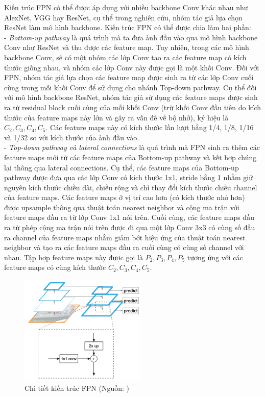 {    \noindent
    Kiến trúc FPN có thể được áp dụng với nhiều backbone Conv khác nhau như AlexNet, VGG hay ResNet, cụ thể trong nghiên cứu, nhóm tác giả lựa chọn ResNet làm mô hình backbone.
    Kiến trúc FPN có thể được chia làm hai phần: \\
    - \textit{Bottom-up pathway} là quá trình mà ta đưa ảnh đầu vào qua mô hình backbone Conv như ResNet và thu được các feature map.
    Tuy nhiên, trong các mô hình backbone Conv, sẽ có một nhóm các lớp Conv tạo ra các feature map có kích thước giống nhau, và nhóm các lớp Conv này được gọi là một khối Conv.
    Đối với FPN, nhóm tác giả lựa chọn các feature map được sinh ra từ các lớp Conv cuối cùng trong mỗi khối Conv để sử dụng cho nhánh Top-down pathway.
    Cụ thể đối với mô hình backbone ResNet, nhóm tác giả sử dụng các feature maps được sinh ra từ residual block cuối cùng của mỗi khối Conv (trừ khối Conv đầu tiên do kích thước của feature maps này lớn và gây ra vấn đề về bộ nhớ), ký hiệu là \textit{{${C}_{2}, {C}_{3}, {C}_{4}, {C}_{5}$}}.
    Các feature maps này có kích thước lần lượt bằng 1/4, 1/8, 1/16 và 1/32 so với kích thước của ảnh đầu vào. \\
    - \textit{Top-down pathway và lateral connections} là quá trình mà FPN sinh ra thêm các feature maps mới từ các feature maps của Bottom-up pathway và kết hợp chúng lại thông qua lateral connections.
    Cụ thể, các feature maps của Bottom-up pathway được đưa qua các lớp Conv có kích thước 1x1, stride bằng 1 nhằm giữ nguyên kích thước chiều dài, chiều rộng và chỉ thay đổi kích thước chiều channel của feature maps.
    Các feature maps ở vị trí cao hơn (có kích thước nhỏ hơn) được upsample thông qua thuật toán nearest neighbor và cộng ma trận với feature maps đầu ra từ lớp Conv 1x1 nói trên.
    Cuối cùng, các feature maps đầu ra từ phép cộng ma trận nói trên được đi qua một lớp Conv 3x3 có cùng số đầu ra channel của feature maps nhằm giảm bớt hiệu ứng của thuật toán nearest neighbor và tạo ra các feature maps đầu ra cuối cùng có cùng số channel với nhau.
    Tập hợp feature maps này được gọi là \textit{{${P}_{2}, {P}_{3}, {P}_{4}, {P}_{5}$}} tương ứng với các feature maps có cùng kích thước \textit{{${C}_{2}, {C}_{3}, {C}_{4}, {C}_{5}$}}.

    \begin{figure}[H]
        \centering
        \includegraphics[width=6cm] {images/fpn_detail}
        \caption{Chi tiết kiến trúc FPN (Nguồn: \cite{lin2017feature})}
        \label{fig:fpn_detail}
    \end{figure}

}
